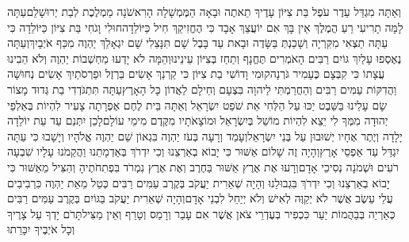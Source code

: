 \documentclass[../main/main.tex]{subfiles}
\begin{document}
\begin{multicols}{\ncols}
וְאַתָּה מִגְדַּל עֵדֶר עֹפֶל בַּת צִיּוֹן עָדֶיךָ תֵאתֶה וּבָאָה הַמֶּמְשָׁלָה הָרִאשֹׁנָה מַמְלֶכֶת לְבַת יְרוּשָׁלֵם\PreVerseSpace{}עַתָּה לָמָּה תָרִיעִי רֵעַ הֲמֶלֶךְ אֵין בָּךְ אִם יוֹעֲצֵךְ אָבָד כִּי הֶחֱזִיקֵךְ חִיל כַּיּוֹלֵדָה\PreVerseSpace{}חוּלִי וָגֹחִי בַּת צִיּוֹן כַּיּוֹלֵדָה כִּי עַתָּה תֵצְאִי מִקִּרְיָה וְשָׁכַנְתְּ בַּשָּׂדֶה וּבָאת עַד בָּבֶל שָׁם תִּנָּצֵלִי שָׁם יִגְאָלֵךְ יַהְוֶה מִכַּף אֹיְבָיִךְ\PreVerseSpace{}וְעַתָּה נֶאֶסְפוּ עָלַיִךְ גּוֹיִם רַבִּים הָאֹמְרִים תֶּחֱנָף וְתַחַז בְּצִיּוֹן עֵינֵינוּ\PreVerseSpace{}וְהֵמָּה לֹא יָדְעוּ מַחְשְׁבוֹת יַהְוֶה וְלֹא הֵבִינוּ עֲצָתוֹ כִּי קִבְּצָם כֶּעָמִיר גֹּרְנָה\PreVerseSpace{}קוּמִי וָדוֹשִׁי בַת צִיּוֹן כִּי קַרְנֵךְ אָשִׂים בַּרְזֶל וּפַרְסֹתַיִךְ אָשִׂים נְחוּשָׁה וַהֲדִקּוֹת עַמִּים רַבִּים וְהַחֲרַמְתִּי לַיהוָה בִּצְעָם וְחֵילָם לַאֲדוֹן כָּל הָאָרֶץ\PreVerseSpace{}עַתָּה תִּתְגֹּדְדִי בַת גְּדוּד מָצוֹר שָׂם עָלֵינוּ בַּשֵּׁבֶט יַכּוּ עַל הַלְּחִי אֵת שֹׁפֵט יִשְׂרָאֵל \ClosedSection{}וְאַתָּה בֵּית לֶחֶם אֶפְרָתָה צָעִיר לִהְיוֹת בְּאַלְפֵי יְהוּדָה מִמְּךָ לִי יֵצֵא לִהְיוֹת מוֹשֵׁל בְּיִשְׂרָאֵל וּמוֹצָאֹתָיו מִקֶּדֶם מִימֵי עוֹלָם\PreVerseSpace{}לָכֵן יִתְּנֵם עַד עֵת יוֹלֵדָה יָלָדָה וְיֶתֶר אֶחָיו יְשׁוּבוּן עַל בְּנֵי יִשְׂרָאֵל\PreVerseSpace{}וְעָמַד וְרָעָה בְּעֹז יַהְוֶה בִּגְאוֹן שֵׁם יַהְוֶה אֱלֹהָיו וְיָשָׁבוּ כִּי עַתָּה יִגְדַּל עַד אַפְסֵי אָרֶץ\PreVerseSpace{}וְהָיָה זֶה שָׁלוֹם אַשּׁוּר כִּי יָבוֹא בְאַרְצֵנוּ וְכִי יִדְרֹךְ בְּאַדְמָתֵנוּ\SubEnd{} וַהֲקֵמֹנוּ עָלָיו שִׁבְעָה רֹעִים וּשְׁמֹנָה נְסִיכֵי אָדָם\PreVerseSpace{}וְרָעוּ אֶת אֶרֶץ אַשּׁוּר בַּחֶרֶב וְאֶת אֶרֶץ נִמְרֹד בִּפְתִחֹתֶיהָ\SubEnd{} וְהִצִּיל מֵאַשּׁוּר כִּי יָבוֹא בְאַרְצֵנוּ וְכִי יִדְרֹךְ בִּגְבוּלֵנוּ \ClosedSection{}וְהָיָה שְׁאֵרִית יַעֲקֹב בְּקֶרֶב עַמִּים רַבִּים כְּטַל מֵאֵת יַהְוֶה כִּרְבִיבִים עֲלֵי עֵשֶׂב אֲשֶׁר לֹא יְקַוֶּה לְאִישׁ וְלֹא יְיַחֵל לִבְנֵי אָדָם\PreVerseSpace{}וְהָיָה שְׁאֵרִית יַעֲקֹב בַּגּוֹיִם בְּקֶרֶב עַמִּים רַבִּים כְּאַרְיֵה בְּבַהֲמוֹת יַעַר כִּכְפִיר בְּעֶדְרֵי צֹאן אֲשֶׁר אִם עָבַר וְרָמַס וְטָרַף וְאֵין מַצִּיל\PreVerseSpace{}תָּרֹם יָדְךָ עַל צָרֶיךָ וְכָל אֹיְבֶיךָ יִכָּרֵתוּ\OpenSection{}\par

\end{multicols}
\end{document}
